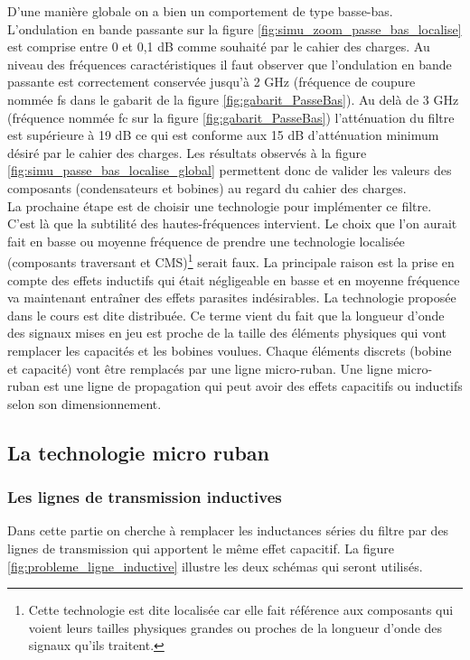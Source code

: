 \documentclass[french]{article}
\begin{document}
D'une manière globale on a bien un comportement de type basse-bas. L'ondulation en bande passante sur la figure \ref{fig:simu_zoom_passe_bas_localise} est comprise entre 0 et 0,1 dB comme souhaité par le cahier des charges. Au niveau des fréquences caractéristiques il faut observer que l'ondulation en bande passante est correctement conservée jusqu'à 2 GHz (fréquence de coupure nommée fs dans le gabarit de la figure \ref{fig:gabarit_PasseBas}). Au delà de 3 GHz (fréquence nommée fc sur la figure \ref{fig:gabarit_PasseBas}) l'atténuation du filtre est supérieure à 19 dB ce qui est conforme aux 15 dB d'atténuation minimum désiré par le cahier des charges. Les résultats observés à la figure \ref{fig:simu_passe_bas_localise_global} permettent donc de valider les valeurs des composants (condensateurs et bobines) au regard du cahier des charges. \\


La prochaine étape est de choisir une technologie pour implémenter ce filtre. C'est là que la subtilité des hautes-fréquences intervient. Le choix que l'on aurait fait en basse ou moyenne fréquence de prendre une technologie localisée (composants traversant et CMS)\footnote{Cette technologie est dite localisée car elle fait référence aux composants qui voient leurs tailles physiques grandes ou proches de la longueur d'onde des signaux qu'ils traitent.} serait faux. La principale raison est la prise en compte des effets inductifs qui était négligeable en basse et en moyenne fréquence va maintenant entraîner des effets parasites indésirables. La technologie proposée dans le cours est dite distribuée. Ce terme vient du fait que la longueur d'onde des signaux mises en jeu est proche de la taille des éléments physiques qui vont remplacer les capacités et les bobines voulues. Chaque éléments discrets (bobine et capacité) vont être remplacés par une ligne micro-ruban. Une ligne micro-ruban est une ligne de propagation qui peut avoir des effets capacitifs ou inductifs selon son dimensionnement. 

\subsection{La technologie micro ruban}
\subsubsection{Les lignes de transmission inductives}


Dans cette partie on cherche à remplacer les inductances séries du filtre par des lignes de transmission qui apportent le même effet capacitif. La figure \ref{fig:probleme_ligne_inductive} illustre les deux schémas qui seront utilisés.
\end{document}

